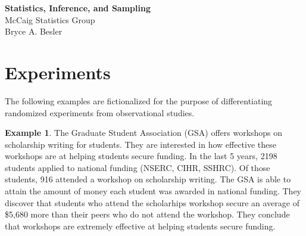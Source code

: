 \documentclass[12pt]{article}
\theoremstyle{definition}
\newtheorem{example}{Example}[section]
\begin{document}
\thispagestyle{empty}
\begin{center}
{\LARGE \bf Statistics, Inference, and Sampling}\\
{\large McCaig Statistics Group}\\
Bryce A. Besler
\end{center}


\section*{Experiments}

The following examples are fictionalized for the purpose of differentiating randomized experiments from observational studies.

\begin{example}
\label{ex:gsa}
The Graduate Student Association (GSA) offers workshops on scholarship writing for students.
They are interested in how effective these workshops are at helping students secure funding.
In the last 5 years, 2198 students applied to national funding (NSERC, CIHR, SSHRC).
Of those students, 916 attended a workshop on scholarship writing.
The GSA is able to attain the amount of money each student was awarded in national funding.
They discover that students who attend the scholarhips workshop secure an average of \$5,680 more than their peers who do not attend the workshop.
They conclude that workshops are extremely effective at helping students secure funding.
\end{example}
\end{document}
